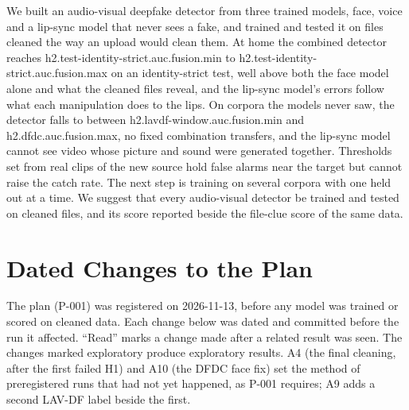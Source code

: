 \documentclass[conference]{IEEEtran}
\begin{document}
We built an audio-visual deepfake detector from three trained models, face,
voice and a lip-sync model that never sees a fake, and trained and tested it
on files cleaned the way an upload would clean them. At home the combined
detector reaches {{h2.test-identity-strict.auc.fusion.min}} to
{{h2.test-identity-strict.auc.fusion.max}} on an identity-strict test, well
above both the face model alone and what the cleaned files reveal, and the
lip-sync model's errors follow what each manipulation does to the lips. On
corpora the models never saw, the detector falls to between
{{h2.lavdf-window.auc.fusion.min}} and {{h2.dfdc.auc.fusion.max}}, no fixed
combination transfers, and the lip-sync model cannot see video whose picture
and sound were generated together. Thresholds set from real clips of the new
source hold false alarms near the target but cannot raise the catch rate. The
next step is training on several corpora with one held out at a time. We
suggest that every audio-visual detector be trained and tested on cleaned
files, and its score reported beside the file-clue score of the same data.

\appendices
\section{Dated Changes to the Plan}
\label{app:changes}

The plan (P-001) was registered on 2026-11-13, before any model was trained
or scored on cleaned data. Each change below was dated and committed before
the run it affected. ``Read'' marks a change made after a related result was seen. The changes
marked exploratory produce exploratory results. A4 (the final cleaning, after
the first failed H1) and A10 (the DFDC face fix) set the method of
preregistered runs that had not yet happened, as P-001 requires; A9 adds a
second LAV-DF label beside the first.
\end{document}
